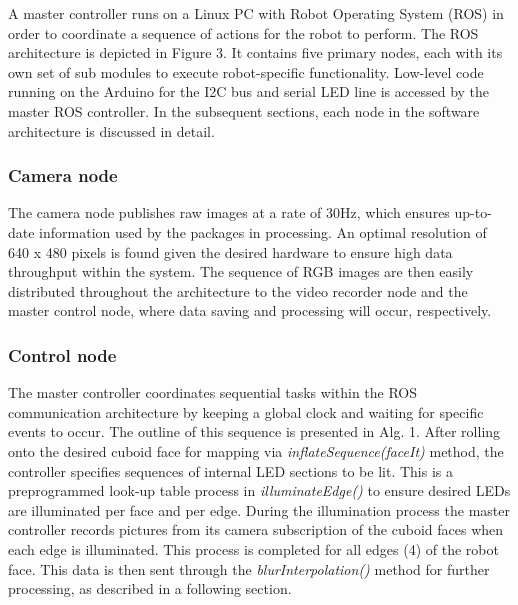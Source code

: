 \documentclass[letterpaper, 12 pt, conference]{ieeeconf}  %
\begin{document}
A master controller runs on a Linux PC with Robot Operating System (ROS) in order to coordinate a sequence of actions for the robot to perform. The ROS architecture is depicted in Figure 3. It contains five primary nodes, each with its own set of sub modules to execute robot-specific functionality. Low-level code running on the Arduino for the I2C bus and serial LED line is accessed by the master ROS controller. In the subsequent sections, each node in the software architecture is discussed in detail. 

\subsubsection{Camera node}

The camera node publishes raw images at a rate of 30Hz, which ensures up-to-date information used by the packages in processing. An optimal resolution of 640 x 480 pixels is found given the desired hardware to ensure high data throughput within the system. The sequence of RGB images are then easily distributed throughout the architecture to the video recorder node and the master control node, where data saving and processing will occur, respectively.   

\subsubsection{Control node}
The master controller coordinates sequential tasks within the ROS communication architecture by keeping a global clock and waiting for specific events to occur. The outline of this sequence is presented in Alg. 1. After rolling onto the desired cuboid face for mapping via \textit{inflateSequence(faceIt)} method, the controller specifies sequences of internal LED sections to be lit. This is a preprogrammed look-up table process in \textit{illuminateEdge()} to ensure desired LEDs are illuminated per face and per edge. During the illumination process the master controller records pictures from its camera subscription of the cuboid faces when each edge is illuminated. This process is completed for all edges (4) of the robot face. This data is then sent through the \textit{blurInterpolation()} method for further processing, as described in a following section. 
\end{document}
